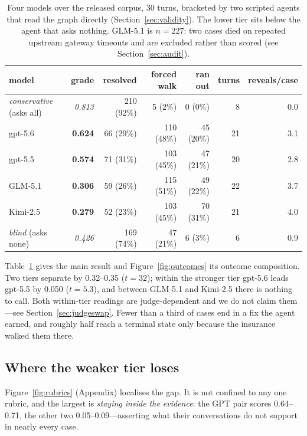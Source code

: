 \documentclass{article} %
\begin{document}
\begin{table}[t]
\caption{Four models over the released corpus, 30 turns, bracketed by two
scripted agents that read the graph directly (Section~\ref{sec:validity}).
The lower tier sits below the agent that asks nothing. GLM-5.1 is
$n=227$: two cases died on repeated upstream gateway timeouts and are
excluded rather than scored (see Section~\ref{sec:audit}).}
\label{tab:main}
\centering
\begin{tabular}{lrrrrrr}
\toprule
model & grade & resolved & forced walk & ran out & turns & reveals/case \\
\midrule
\emph{conservative} (asks all) & \emph{0.813} & 210 (92\%) & 5 (2\%) & 0 (0\%) & 8 & 0.0 \\
\midrule
gpt-5.6  & \textbf{0.624} & 66 (29\%) & 110 (48\%) & 45 (20\%) & 21 & 3.1 \\
gpt-5.5  & \textbf{0.574} & 71 (31\%) & 103 (45\%) & 47 (21\%) & 20 & 2.8 \\
GLM-5.1  & \textbf{0.306} & 59 (26\%) & 115 (51\%) & 49 (22\%) & 22 & 3.7 \\
Kimi-2.5 & \textbf{0.279} & 52 (23\%) & 103 (45\%) & 70 (31\%) & 21 & 4.0 \\
\midrule
\emph{blind} (asks none) & \emph{0.426} & 169 (74\%) & 47 (21\%) & 6 (3\%) & 6 & 0.9 \\
\bottomrule
\end{tabular}
\end{table}

Table~\ref{tab:main} gives the main result and
Figure~\ref{fig:outcomes} its outcome composition. Two tiers separate by
0.32--0.35 ($t = 32$); within the stronger tier gpt-5.6 leads gpt-5.5 by
0.050 ($t = 5.3$), and between GLM-5.1 and Kimi-2.5 there is nothing to
call. Both within-tier readings are judge-dependent and we do not claim
them---see Section~\ref{sec:judgeswap}. Fewer than a third of cases end in a fix the agent earned, and
roughly half reach a terminal state only because the insurance walked
them there.

\subsection{Where the weaker tier loses}

Figure~\ref{fig:rubrics} (Appendix) localises the gap. It is not confined to any one
rubric, and the largest is \emph{staying inside the evidence}: the GPT
pair scores 0.64--0.71, the other two 0.05--0.09---asserting what their
conversations do not support in nearly every case.
\end{document}
